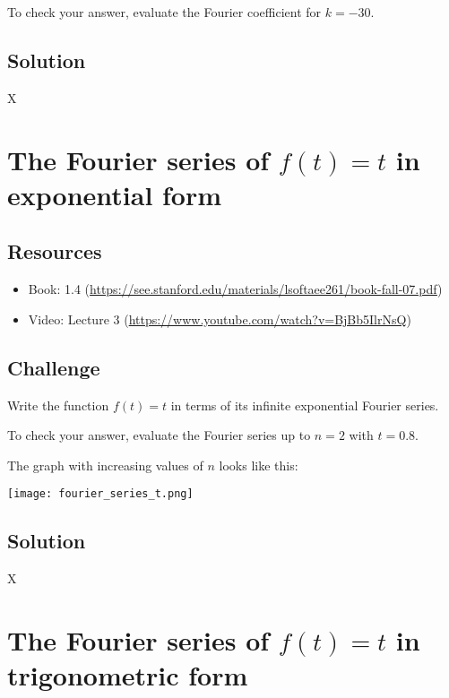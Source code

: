To check your answer, evaluate the Fourier coefficient for $k=-30$.

\subsection*{Solution}
X





\newpage

\section{The Fourier series of $f(t)=t$ in exponential form}
\label{sec:fstexpform}

\subsection*{Resources}
\begin{itemize}
    \item Book: 1.4 (\url{https://see.stanford.edu/materials/lsoftaee261/book-fall-07.pdf})
    \item Video: Lecture 3 (\url{https://www.youtube.com/watch?v=BjBb5IlrNsQ})
\end{itemize}

\subsection*{Challenge}
Write the function $f(t)=t$ in terms of its infinite exponential Fourier series.

To check your answer, evaluate the Fourier series up to $n=2$ with $t=0.8$.

The graph with increasing values of $n$ looks like this:

\texttt{[image: fourier\_series\_t.png]}

\subsection*{Solution}
X





\newpage

\section{The Fourier series of $f(t)=t$ in trigonometric form}

